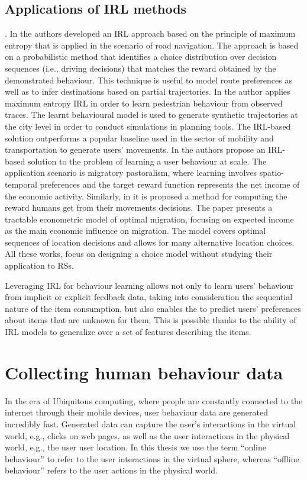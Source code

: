 \subsection{Applications of IRL methods}.
In \cite{maxentirl} the authors developed an IRL approach based on the principle of maximum entropy that is applied in the scenario of road navigation. The approach is based on a probabilistic method that identifies a choice distribution over decision sequences (i.e., driving decisions) that matches the reward obtained by the demonstrated behaviour. This technique is useful to model route preferences as well as to infer destinations based on partial trajectories.
In \cite{irl:pedestrian} the author applies maximum entropy IRL in order to learn pedestrian behaviour from observed traces. The learnt behavioural model is used to generate synthetic trajectories at the city level in order to conduct simulations in planning tools. The IRL-based solution outperforms a popular baseline used in the sector of mobility and transportation to generate users' movements.
In \cite{ermon:2015} the authors propose an IRL-based solution to the problem of learning a user behaviour at scale. The application scenario is migratory pastoralism, where learning involves spatio-temporal preferences and the target reward function represents the net income of the economic activity. Similarly, in \cite{Kennan2011} it is proposed a method for computing the reward humans get from their movements decisions. The paper presents a tractable econometric model of optimal migration, focusing on expected income as the main economic influence on migration. The model covers optimal sequences of location decisions and allows for many alternative location choices. All these works, focus on designing a choice model without studying their application to RSs. 

Leveraging IRL for behaviour learning allows not only to learn users' behaviour from implicit or explicit feedback data, taking into consideration the sequential nature of the item consumption, but also enables the to predict users' preferences about items that are unknown for them. This is possible thanks to the ability of IRL models to generalize over a set of features describing the items. 

\section{Collecting human behaviour data}
In the era of Ubiquitous computing, where people are constantly connected to the internet through their mobile devices, user behaviour data are generated incredibly fast. 
Generated data can capture the user's interactions in the virtual world, e.g., clicks on web pages, as well as the user interactions in the physical world, e.g., the user user location.
In this thesis we use the term ``online behaviour'' to refer to the user interactions in the virtual sphere, whereas ``offline behaviour'' refers to the user actions in the physical world.

